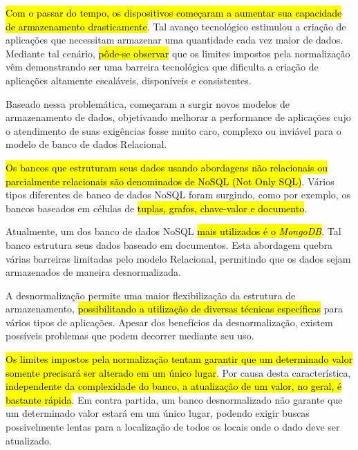\hl{Com o passar do tempo, os dispositivos começaram a aumentar sua capacidade de armazenamento drasticamente}. Tal avanço tecnológico estimulou a criação de aplicações que necessitam armazenar uma quantidade cada vez maior de dados. Mediante tal cenário, \hl{pôde-se observar} que os limites impostos pela normalização vêm demonstrando ser uma barreira tecnológica que dificulta a criação de aplicações altamente escaláveis, disponíveis e consistentes.



Baseado nessa problemática, começaram a surgir novos modelos de armazenamento de dados, objetivando melhorar a performance de aplicações cujo o atendimento de suas exigências fosse muito caro, complexo ou inviável para o modelo de banco de dados Relacional.

\hl{Os bancos que estruturam seus dados usando abordagens não relacionais ou parcialmente relacionais são denominados de NoSQL (Not Only SQL)}. Vários tipos diferentes de banco de dados NoSQL foram surgindo, como por exemplo, os bancos baseados em células de \hl{tuplas, grafos, chave-valor e documento}.



Atualmente, um dos banco de dados NoSQL \hl{mais utilizados é o \textit{MongoDB}}. Tal banco estrutura seus dados baseado em documentos. Esta abordagem quebra várias barreiras limitadas pelo modelo Relacional, permitindo que os dados sejam armazenados de maneira desnormalizada.


A desnormalização permite uma maior flexibilização da estrutura de armazenamento, \hl{possibilitando a utilização de diversas técnicas específicas} para vários tipos de aplicações. Apesar dos benefícios da desnormalização, existem possíveis problemas que podem decorrer mediante seu uso.


\hl{Os limites impostos pela normalização tentam garantir que um determinado valor somente precisará ser alterado em um único lugar}. Por causa desta característica, \hl{independente da complexidade do banco, a atualização de um valor, no geral, é bastante rápida}. Em contra partida, um banco desnormalizado não garante que um determinado valor estará em um único lugar, podendo exigir buscas possivelmente lentas para a localização de todos os locais onde o dado deve ser atualizado.

